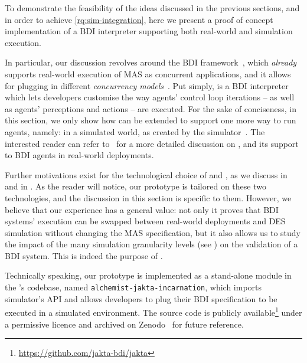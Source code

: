To demonstrate the feasibility of the ideas discussed in the previous sections,
and in order to achieve \ref{rq:sim-integration},
here we present a proof of concept implementation of a \ac{BDI} interpreter supporting both real-world and simulation execution.

In particular,
our discussion revolves around the \jakta{} \ac{BDI} framework~\cite{BaiardiBCP23},
which \emph{already} supports real-world execution of \ac{MAS} as concurrent applications,
and it allows for plugging in different \emph{concurrency models}~\cite{BaiardiBCPOR24b}.
%
Put simply,
\jakta{} is a \ac{BDI} interpreter which lets developers customise the way agents' control loop iterations -- as well as agents' perceptions and actions -- are executed.
%
For the sake of conciseness,
in this section,
we only show how \jakta{} can be extended to support one more way to run agents,
namely:
in a simulated world,
as created by the \alchemist{} simulator~\cite{PianiniJOS2013}.
%
The interested reader can refer to~\cite{SNCS:JaktaJournal} for a more detailed discussion on \jakta{},
and its support to \ac{BDI} agents in real-world deployments.

Further motivations exist for the technological choice of \jakta{} and \alchemist{},
as we discuss in  and in .
%
As the reader will notice,
our prototype is tailored on these two technologies,
and the discussion in this section is specific to them.
%
However,
we believe that our experience has a general value:
not only it proves that \ac{BDI} systems' execution can be swapped between real-world deployments and \ac{DES} simulation
without changing the \ac{MAS} specification,
but it also allows us to study the impact of the many simulation granularity levels (see )
on the validation of a \ac{BDI} system.
%
This is indeed the purpose of .

Technically speaking,
our prototype is implemented
as a stand-alone module in the \jakta's codebase,
named \texttt{alchemist-\allowbreak{}jakta-\allowbreak{}incarnation},
which imports simulator's \ac{API}
and allows developers to plug their \ac{BDI} specification
to be executed in a simulated environment.
%
The source code is publicly available\footnote{
    \url{https://github.com/jakta-bdi/jakta}
}
under a permissive licence
and archived on Zenodo~\cite{zenodojaktajaamas}
for future reference.

